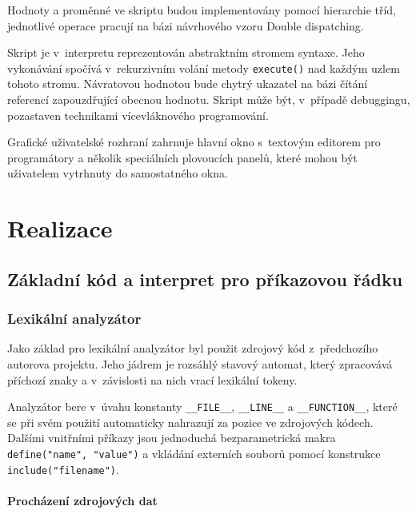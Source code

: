 \documentclass[11pt,twoside,a4paper]{book}
\begin{document}
Hodnoty a proměnné ve skriptu budou implementovány pomocí hierarchie tříd, jednotlivé operace pracují na bázi návrhového vzoru Double dispatching.

Skript je v~interpretu reprezentován abstraktním stromem syntaxe. Jeho vykonávání spočívá v~rekurzivním volání metody \texttt{execute()} nad každým uzlem tohoto stromu. Ná\-vra\-to\-vou hodnotou bude chytrý ukazatel na bázi čítání referencí zapouzdřující obecnou hodnotu. Skript může být, v~případě debuggingu, pozastaven technikami ví\-ce\-vlák\-no\-vé\-ho programování.

Grafické uživatelské rozhraní zahrnuje hlavní okno s~textovým editorem pro programátory a několik speciálních plovoucích panelů, které mohou být uživatelem vytrhnuty do samostatného okna.



\chapter{Realizace}


\section{Základní kód a interpret pro příkazovou řádku}

\subsection{Lexikální analyzátor}

Jako základ pro lexikální analyzátor byl použit zdrojový kód z~předchozího autorova projektu. Jeho jádrem je rozsáhlý stavový automat, který zpracovává příchozí znaky a v~závislosti na nich vrací lexikální tokeny.

Analyzátor bere v~úvahu konstanty \texttt{\_\_FILE\_\_}, \texttt{\_\_LINE\_\_} a \texttt{\_\_FUNCTION\_\_}, které se při svém použití automaticky nahrazují za pozice ve zdrojových kódech. Dalšími vnitřními příkazy jsou jednoduchá bezparametrická makra \texttt{define("name", "value")} a vkládání externích souborů pomocí konstrukce \texttt{include("filename")}.

\subsubsection{Procházení zdrojových dat}
\end{document}
